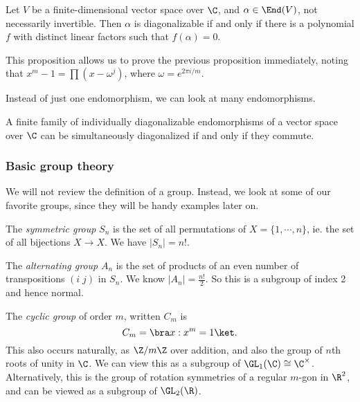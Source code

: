 \documentclass[a4paper]{article}
\begin{document}
\begin{prop}
  Let $V$ be a finite-dimensional vector space over $\C$, and $\alpha \in \End(V)$, not necessarily invertible. Then $\alpha$ is diagonalizable if and only if there is a polynomial $f$ with distinct linear factors such that $f(\alpha) = 0$.
\end{prop}
This proposition allows us to prove the previous proposition immediately, noting that $x^m - 1 = \prod(x - \omega^j)$, where $\omega = e^{2\pi i/m}$.

Instead of just one endomorphism, we can look at many endomorphisms.

\begin{prop}
  A finite family of individually diagonalizable endomorphisms of a vector space over $\C$ can be simultaneously diagonalized if and only if they commute.
\end{prop}

\subsubsection*{Basic group theory}
We will not review the definition of a group. Instead, we look at some of our favorite groups, since they will be handy examples later on.

\begin{defi}
  The \emph{symmetric group} $S_n$ is the set of all permutations of $X = \{1, \cdots, n\}$, ie. the set of all bijections $X \to X$. We have $|S_n| = n!$.
\end{defi}

\begin{defi}
  The \emph{alternating group} $A_n$ is the set of products of an even number of transpositions $(i\; j)$ in $S_n$. We know $|A_n| = \frac{n!}{2}$. So this is a subgroup of index 2 and hence normal.
\end{defi}

\begin{defi}
  The \emph{cyclic group} of order $m$, written $C_m$ is
  \[
    C_m = \bra x: x^m = 1\ket.
  \]
  This also occurs naturally, as $\Z/m\Z$ over addition, and also the group of $n$th roots of unity in $\C$. We can view this as a subgroup of $\GL_1(\C) \cong \C^\times$. Alternatively, this is the group of rotation symmetries of a regular $m$-gon in $\R^2$, and can be viewed as a subgroup of $\GL_2(\R)$.
\end{defi}
\end{document}
